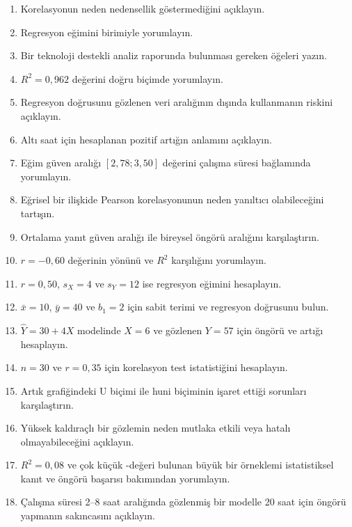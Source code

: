 \begin{enumerate}
  \item Korelasyonun neden nedensellik göstermediğini açıklayın.
  \item Regresyon eğimini birimiyle yorumlayın.
  \item Bir teknoloji destekli analiz raporunda bulunması gereken öğeleri yazın.
  \item $R^2=0{,}962$ değerini doğru biçimde yorumlayın.
  \item Regresyon doğrusunu gözlenen veri aralığının dışında kullanmanın riskini açıklayın.
  \item Altı saat için hesaplanan pozitif artığın anlamını açıklayın.
  \item Eğim güven aralığı $[2{,}78;3{,}50]$ değerini çalışma süresi bağlamında yorumlayın.
  \item Eğrisel bir ilişkide Pearson korelasyonunun neden yanıltıcı olabileceğini tartışın.
  \item Ortalama yanıt güven aralığı ile bireysel öngörü aralığını karşılaştırın.
  \item $r=-0{,}60$ değerinin yönünü ve $R^2$ karşılığını yorumlayın.
  \item $r=0{,}50$, $s_X=4$ ve $s_Y=12$ ise regresyon eğimini hesaplayın.
  \item $\bar x=10$, $\bar y=40$ ve $b_1=2$ için sabit terimi ve regresyon
  doğrusunu bulun.
  \item $\hat Y=30+4X$ modelinde $X=6$ ve gözlenen $Y=57$ için öngörü ve
  artığı hesaplayın.
  \item $n=30$ ve $r=0{,}35$ için korelasyon test istatistiğini hesaplayın.
  \item Artık grafiğindeki U biçimi ile huni biçiminin işaret ettiği sorunları
  karşılaştırın.
  \item Yüksek kaldıraçlı bir gözlemin neden mutlaka etkili veya hatalı
  olmayabileceğini açıklayın.
  \item $R^2=0{,}08$ ve çok küçük \pval-değeri bulunan büyük bir örneklemi
  istatistiksel kanıt ve öngörü başarısı bakımından yorumlayın.
  \item Çalışma süresi 2--8 saat aralığında gözlenmiş bir modelle 20 saat için
  öngörü yapmanın sakıncasını açıklayın.
\end{enumerate}